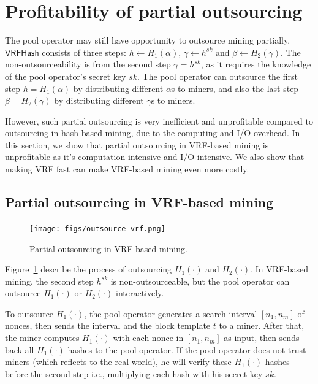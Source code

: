 \section{Profitability of partial outsourcing}
\label{sec:partial-outsourcing}

The pool operator may still have opportunity to outsource mining partially.
$\mathsf{VRFHash}$ consists of three steps: $h \gets H_1(\alpha)$, $\gamma \gets h^{sk}$ and $\beta \gets H_2(\gamma)$.
The non-outsourceability is from the second step $\gamma = h^{sk}$, as it requires the knowledge of the pool operator's secret key $sk$.
The pool operator can outsource the first step $h = H_1(\alpha)$ by distributing different $\alpha$s to miners, and also the last step $\beta = H_2(\gamma)$ by distributing different $\gamma$s to miners.

However, such partial outsourcing is very inefficient and unprofitable compared to outsourcing in hash-based mining, due to the computing and I/O overhead.
In this section, we show that partial outsourcing in VRF-based mining is unprofitable as it's computation-intensive and I/O intensive.
We also show that making VRF fast can make VRF-based mining even more costly.

\subsection{Partial outsourcing in VRF-based mining}

\begin{figure}[htp]
    \centering
    \texttt{[image: figs/outsource-vrf.png]}
    \caption{Partial outsourcing in VRF-based mining.}
    \label{fig:outsource-vrf}
\end{figure}

Figure~\ref{fig:outsource-vrf} describe the process of outsourcing $H_1(\cdot)$ and $H_2(\cdot)$.
In VRF-based mining, the second step $h^{sk}$ is non-outsourceable, but the pool operator can outsource $H_1(\cdot)$ or $H_2(\cdot)$ interactively.

To outsource $H_1(\cdot)$, the pool operator generates a search interval $[n_1, n_m]$ of nonces, then sends the interval and the block template $t$ to a miner.
After that, the miner computes $H_1(\cdot)$ with each nonce in $[n_1, n_m]$ as input, then sends back all $H_1(\cdot)$ hashes to the pool operator.
If the pool operator does not trust miners (which reflects to the real world), he will verify these $H_1(\cdot)$ hashes before the second step i.e., multiplying each hash with his secret key $sk$.

